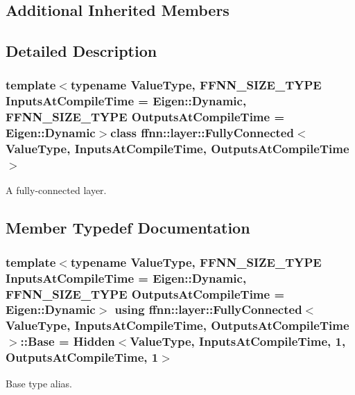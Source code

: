 \subsection*{Additional Inherited Members}


\subsection{Detailed Description}
\subsubsection*{template$<$typename Value\-Type, F\-F\-N\-N\-\_\-\-S\-I\-Z\-E\-\_\-\-T\-Y\-P\-E Inputs\-At\-Compile\-Time = Eigen\-::\-Dynamic, F\-F\-N\-N\-\_\-\-S\-I\-Z\-E\-\_\-\-T\-Y\-P\-E Outputs\-At\-Compile\-Time = Eigen\-::\-Dynamic$>$class ffnn\-::layer\-::\-Fully\-Connected$<$ Value\-Type, Inputs\-At\-Compile\-Time, Outputs\-At\-Compile\-Time $>$}

A fully-\/connected layer. 

\subsection{Member Typedef Documentation}
\hypertarget{classffnn_1_1layer_1_1_fully_connected_a406c6254decac6bb885090f49476f72a}{
\subsubsection[{Base}]{\setlength{\rightskip}{0pt plus 5cm}template$<$typename Value\-Type, F\-F\-N\-N\-\_\-\-S\-I\-Z\-E\-\_\-\-T\-Y\-P\-E Inputs\-At\-Compile\-Time = Eigen\-::\-Dynamic, F\-F\-N\-N\-\_\-\-S\-I\-Z\-E\-\_\-\-T\-Y\-P\-E Outputs\-At\-Compile\-Time = Eigen\-::\-Dynamic$>$ using {\bf ffnn\-::layer\-::\-Fully\-Connected}$<$ Value\-Type, Inputs\-At\-Compile\-Time, Outputs\-At\-Compile\-Time $>$\-::{\bf Base} =  {\bf Hidden}$<$Value\-Type, Inputs\-At\-Compile\-Time, 1, Outputs\-At\-Compile\-Time, 1$>$}}\label{classffnn_1_1layer_1_1_fully_connected_a406c6254decac6bb885090f49476f72a}


Base type alias. 

